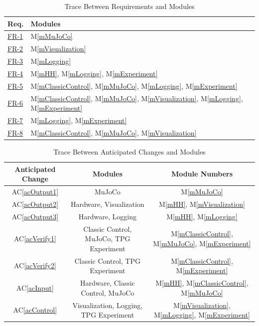 \documentclass[12pt, titlepage]{article}
\newcommand{\acref}[1]{AC\ref{#1}}
\newcommand{\mref}[1]{M\ref{#1}}
\begin{document}
\begin{table}[H]
\centering
\begin{tabular}{p{} p{}}
\toprule
\textbf{Req.} & \textbf{Modules}\\
\midrule
\href{https://github.com/TPGEngine/tpg/blob/main/docs/SRS/SRS.pdf}{FR-1} & \mref{mMuJoCo}\\
\href{https://github.com/TPGEngine/tpg/blob/main/docs/SRS/SRS.pdf}{FR-2} & \mref{mVisualization}\\
\href{https://github.com/TPGEngine/tpg/blob/main/docs/SRS/SRS.pdf}{FR-3} & \mref{mLogging}\\
\href{https://github.com/TPGEngine/tpg/blob/main/docs/SRS/SRS.pdf}{FR-4} & \mref{mHH}, \mref{mLogging}, \mref{mExperiment}\\
\href{https://github.com/TPGEngine/tpg/blob/main/docs/SRS/SRS.pdf}{FR-5} & \mref{mClassicControl}, \mref{mMuJoCo}, \mref{mLogging}, \mref{mExperiment}\\
\href{https://github.com/TPGEngine/tpg/blob/main/docs/SRS/SRS.pdf}{FR-6} & \mref{mClassicControl}, \mref{mMuJoCo}, \mref{mVisualization}, \mref{mLogging}, \mref{mExperiment}\\
\href{https://github.com/TPGEngine/tpg/blob/main/docs/SRS/SRS.pdf}{FR-7} & \mref{mLogging}, \mref{mExperiment}\\
\href{https://github.com/TPGEngine/tpg/blob/main/docs/SRS/SRS.pdf}{FR-8} & \mref{mClassicControl}, \mref{mMuJoCo}, \mref{mVisualization}\\
\bottomrule
\end{tabular}
\caption{Trace Between Requirements and Modules}
\label{TblRT}
\end{table}

\begin{table}[H]
  \centering
  \begin{tabular}{|c|c|c|} \hline 
  \toprule
  Anticipated Change
  & Modules & Module Numbers
  \\
  \midrule
  \acref{acOutput1}
  & MuJoCo & \mref{mMuJoCo}
  \\
  \acref{acOutput2}
  & Hardware, Visualization & \mref{mHH}, \mref{mVisualization}
  \\
  \acref{acOutput3}
  & Hardware, Logging & \mref{mHH}, \mref{mLogging}
  \\
  \acref{acVerify1}
  & Classic Control, MuJoCo, TPG Experiment  & \mref{mClassicControl}, \mref{mMuJoCo}, \mref{mExperiment}
  \\
  \acref{acVerify2}
  & Classic Control, TPG Experiment  & \mref{mClassicControl}, \mref{mExperiment}
  \\
  \acref{acInput}
  & Hardware, Classic Control, MuJoCo & \mref{mHH}, \mref{mClassicControl}, \mref{mMuJoCo}
  \\
  \acref{acControl}
  & Visualization, Logging, TPG Experiment & \mref{mVisualization}, \mref{mLogging}, \mref{mExperiment}
  \\
  \bottomrule
  \end{tabular}
  \caption{Trace Between Anticipated Changes and Modules}
  \label{TblACT}
  \end{table}
\end{document}
